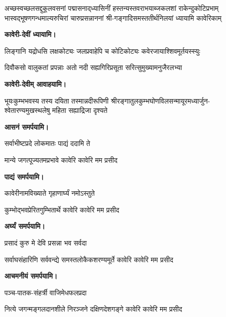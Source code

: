 \begin{center}

\begin{center}

\fourlineindentedshloka
{अच्छस्वच्छलसद्दुकूलवसनां पद्मासनाद्‍ध्यासिनीं}
{हस्तन्यस्तवराभयाब्जकलशां राकेन्दुकोटिप्रभाम्}
{भास्वद्भूषणगन्धमाल्यरुचिरां चारुप्रसन्नाननां}
{श्री-गङ्गादिसमस्ततीर्थनिलयां ध्यायामि कावेरिकाम्}

\textbf{कावेरी-देवीं ध्यायामि।}

{लिङ्गानि यद्रोधसि लक्षकोट्यः}
{जलप्रवाहेपि च कोटिकोट्यः}
{कवेरजायाश्शिवमूर्तयस्स्युः}

{दिवौकसो वालुकतां प्रपन्नाः}
{अतो नदी सह्यगिरिप्रसूता}
{सरित्सुमुख्यामनुजैरलभ्या}

\textbf{कावेरी-देवीम् आवाहयामि।}

{भूयःकुम्भभवस्य तस्य दयिता तस्मान्नदीरूपिणी}
{श्रीरङ्गातुलकुम्भघोणविलसन्मायूरमध्यार्जुन-}
{श्वेतारण्यमुखस्थलेषु महिता सह्याद्रिजा दृश्यते}

\textbf{\devAya{} आसनं समर्पयामि।}

{सर्वाभीष्टप्रदे लोकमातः पाद्यं ददामि ते}

{मान्ये जगत्पूज्यतमप्रभावे कावेरि कावेरि मम प्रसीद}

\textbf{\devAya{} पाद्यं समर्पयामि।}


{कावेरीनामविख्याते गृहाणार्घ्यं नमोऽस्तुते}

{कुम्भोद्भवप्रेरितगुम्भितार्थे कावेरि कावेरि मम प्रसीद}

\textbf{\devAya{} अर्घ्यं समर्पयामि।}

{प्रसादं कुरु मे देवि प्रसन्ना भव सर्वदा}

{सर्वाघसंहारिणि सर्ववन्द्ये}
{समस्तलोकैकशरण्यमूर्ते}
{कावेरि कावेरि मम प्रसीद}

\textbf{\devAya{} आचमनीयं समर्पयामि।}

{पञ्च-पातक-संहर्त्री वाजिमेधफलप्रदा}

{नित्ये जगन्मङ्गलदानशीले}
{निरञ्जने दक्षिणदेशगङ्गे}
{कावेरि कावेरि मम प्रसीद}


\end{center}
\end{center}
